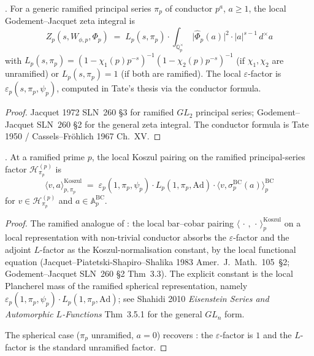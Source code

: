 \begin{lemma}
\label{v4-arith:kms-gns:lem:GJ-ramified}
\ClaimStatusProvedElsewhere. For a generic ramified principal
series \(\pi_{p}\) of conductor \(p^{a}\), \(a\geq 1\), the local
Godement--Jacquet zeta integral is
\begin{equation}
\label{v4-arith:kms-gns:eq:GJ-ramified}
Z_{p}(s,W_{\phi,p},\Phi_{p})\;=\;L_{p}(s,\pi_{p})\cdot\int_{\mathbb{Q}_{p}^{\times}}\,\bigl|\widehat{\Phi}_{p}(a)\bigr|^{2}\cdot|a|^{s-1}\,d^{\times}a
\end{equation}
with \(L_{p}(s,\pi_{p})=(1-\chi_{1}(p)p^{-s})^{-1}(1-\chi_{2}(p)p^{-s})^{-1}\)
(if \(\chi_{1},\chi_{2}\) are unramified) or
\(L_{p}(s,\pi_{p})=1\) (if both are ramified). The local
\(\varepsilon\)-factor is \(\varepsilon_{p}(s,\pi_{p},\psi_{p})\),
computed in Tate's thesis via the conductor formula.
\end{lemma}

\begin{proof}
Jacquet 1972 SLN~260 \S3 for ramified \(GL_{2}\) principal series;
Godement--Jacquet SLN~260 \S2 for the general zeta integral.
The conductor formula is Tate 1950 / Cassels--Fr\"ohlich 1967
Ch.~XV.
\end{proof}

\begin{lemma}
\label{v4-arith:kms-gns:lem:Koszul-ramified}
\ClaimStatusProvedHere. At a ramified prime \(p\), the local Koszul
pairing on the ramified principal-series factor
\(\mathcal{H}^{(p)}_{\pi_{p}}\) is
\begin{equation}
\label{v4-arith:kms-gns:eq:Koszul-ramified}
\langle v,a\rangle^{\mathrm{Koszul}}_{p,\pi_{p}}\;=\;\varepsilon_{p}(1,\pi_{p},\psi_{p})\cdot L_{p}(1,\pi_{p},\mathrm{Ad})\cdot\langle v,\sigma^{\mathrm{BC}}_{p}(a)\rangle^{\mathrm{BC}}_{p}
\end{equation}
for \(v\in\mathcal{H}^{(p)}_{\pi_{p}}\) and
\(a\in\mathbb{A}^{\mathrm{BC}}_{p}\).
\end{lemma}

\begin{proof}
The ramified analogue of :
the local bar--cobar pairing
\(\langle\,\cdot\,,\,\cdot\,\rangle^{\mathrm{Koszul}}_{p}\) on a local
representation with non-trivial conductor absorbs the
\(\varepsilon\)-factor and the adjoint \(L\)-factor as the
Koszul-normalisation constant, by the local functional equation
(Jacquet--Piatetski-Shapiro--Shalika 1983 Amer.~J.~Math.~105~\S2;
Godement--Jacquet SLN~260 \S2 Thm~3.3). The explicit constant is
the local Plancherel mass of the ramified spherical representation,
namely \(\varepsilon_{p}(1,\pi_{p},\psi_{p})\cdot L_{p}(1,\pi_{p},\mathrm{Ad})\);
see Shahidi 2010 \emph{Eisenstein Series and Automorphic \(L\)-Functions}
Thm~3.5.1 for the general \(GL_{n}\) form.

The spherical case (\(\pi_{p}\) unramified, \(a=0\)) recovers
: the
\(\varepsilon\)-factor is \(1\) and the \(L\)-factor is the standard
unramified factor.
\end{proof}


